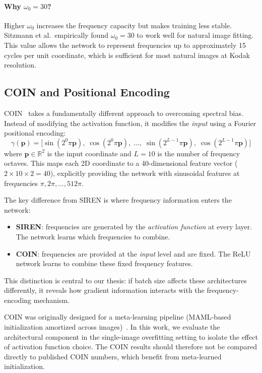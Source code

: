 \documentclass[a4paper,oneside,11pt,english]{scrartcl}
\begin{document}
\paragraph{Why $\omega_0 = 30$?}
Higher $\omega_0$ increases the frequency capacity but makes training less
stable.  Sitzmann et al.\ empirically found $\omega_0 = 30$ to work well
for natural image fitting.  This value allows the network to represent
frequencies up to approximately 15 cycles per unit coordinate, which is
sufficient for most natural images at Kodak resolution.

\subsection{COIN and Positional Encoding}
\label{sec:coin}

COIN~\cite{dupont2021coin} takes a fundamentally different approach to
overcoming spectral bias.  Instead of modifying the activation function,
it modifies the \emph{input} using a Fourier positional encoding:
\begin{equation}
    \gamma(\mathbf{p}) = \bigl[\sin(2^0 \pi \mathbf{p}), \;
    \cos(2^0 \pi \mathbf{p}), \; \ldots, \;
    \sin(2^{L-1} \pi \mathbf{p}), \;
    \cos(2^{L-1} \pi \mathbf{p})\bigr]
\end{equation}
where $\mathbf{p} \in \mathbb{R}^2$ is the input coordinate and $L = 10$
is the number of frequency octaves.  This maps each 2D coordinate to a
40-dimensional feature vector ($2 \times 10 \times 2 = 40$), explicitly
providing the network with sinusoidal features at frequencies
$\pi, 2\pi, \ldots, 512\pi$.

The key difference from SIREN is where frequency information enters the
network:
\begin{itemize}
    \item \textbf{SIREN}: frequencies are generated by the \emph{activation
          function} at every layer.  The network learns which frequencies to
          combine.
    \item \textbf{COIN}: frequencies are provided at the \emph{input} level
          and are fixed.  The ReLU network learns to combine these fixed
          frequency features.
\end{itemize}

This distinction is central to our thesis: if batch size affects these
architectures differently, it reveals how gradient information interacts
with the frequency-encoding mechanism.

COIN was originally designed for a meta-learning pipeline (MAML-based
initialization amortized across images)~\cite{dupont2022coinpp}.  In this
work, we evaluate the architectural component in the single-image
overfitting setting to isolate the effect of activation function choice.
The COIN results should therefore not be compared directly to published
COIN numbers, which benefit from meta-learned initialization.
\end{document}

